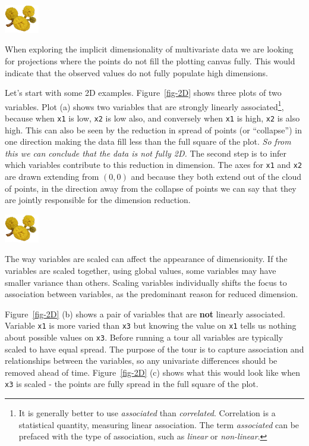 \documentclass[
  letterpaper,
]{krantz}
\newcommand{\infobox}[1]{%
\noindent\colorbox{info!30}{%
\begin{minipage}{0.98\linewidth}%
    \centering%
    \begin{minipage}[c]{0.15\linewidth} %
      \includegraphics[width=1.5cm]{images/mulga-flowers2.png} %
    \end{minipage}%
    \hfill %
    \begin{minipage}[c]{0.8\linewidth} %
      \bigskip%
      \textsf{#1}%
      \bigskip%
    \end{minipage}%
    \hspace*{3mm}%
  \end{minipage}%
}%
}
\begin{document}
\infobox{When exploring the implicit dimensionality of multivariate data we are looking for projections where the points do not fill the plotting canvas fully. This would indicate that the observed values do not fully populate high dimensions. }

Let's start with some 2D examples. Figure~\ref{fig-2D} shows three plots
of two variables. Plot (a) shows two variables that are strongly
linearly associated\footnote{It is generally better to use
  \emph{associated} than \emph{correlated}. Correlation is a statistical
  quantity, measuring linear association. The term \emph{associated} can
  be prefaced with the type of association, such as \emph{linear} or
  \emph{non-linear}.}, because when \texttt{x1} is low, \texttt{x2} is
low also, and conversely when \texttt{x1} is high, \texttt{x2} is also
high. This can also be seen by the reduction in spread of points (or
``collapse'') in one direction making the data fill less than the full
square of the plot. \emph{So from this we can conclude that the data is
not fully 2D.} The second step is to infer which variables contribute to
this reduction in dimension. The axes for \texttt{x1} and \texttt{x2}
are drawn extending from \((0,0)\) and because they both extend out of
the cloud of points, in the direction away from the collapse of points
we can say that they are jointly responsible for the dimension
reduction.

\infobox{The way variables are scaled can affect the appearance of dimensionity. If the variables are scaled together, using global values, some variables may have smaller variance than others. Scaling variables individually shifts the focus to association between variables, as the predominant reason for reduced dimension.}

Figure~\ref{fig-2D} (b) shows a pair of variables that are \textbf{not}
linearly associated. Variable \texttt{x1} is more varied than
\texttt{x3} but knowing the value on \texttt{x1} tells us nothing about
possible values on \texttt{x3}. Before running a tour all variables are
typically scaled to have equal spread. The purpose of the tour is to
capture association and relationships between the variables, so any
univariate differences should be removed ahead of time.
Figure~\ref{fig-2D} (c) shows what this would look like when \texttt{x3}
is scaled - the points are fully spread in the full square of the plot.
\end{document}
